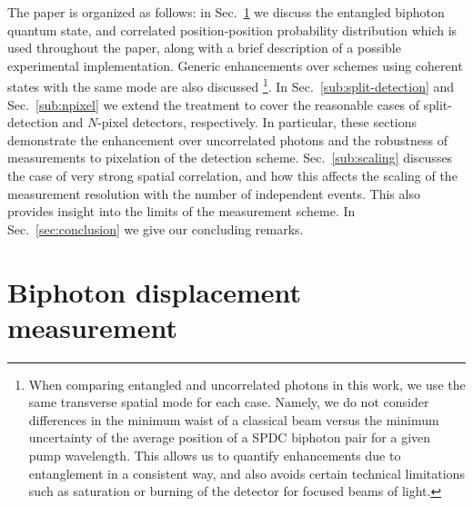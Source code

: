 The paper is organized as follows: 
in Sec.~\ref{sec:biphoton displacement} we discuss the entangled biphoton quantum state, and correlated position-position probability distribution which is used throughout the paper, along with a brief description of a possible experimental implementation.  
Generic enhancements over schemes using coherent states with the same mode are also discussed \footnote{When comparing entangled and uncorrelated photons in this work, we use the same transverse spatial mode for each case.  
	Namely, we do not consider differences in the minimum waist of a classical beam versus the minimum uncertainty of the average position of a SPDC biphoton pair for a given pump wavelength.  
	This allows us to quantify enhancements due to entanglement in a consistent way, and also avoids certain technical limitations such as saturation or burning of the detector for focused beams of light.}.
In Sec.~\ref{sub:split-detection} and Sec.~\ref{sub:npixel} we extend the treatment to cover the reasonable cases of split-detection and $N$-pixel detectors, respectively.
In particular, these sections demonstrate the enhancement over uncorrelated photons and the robustness of measurements to pixelation of the detection scheme.
Sec.~\ref{sub:scaling} discusses the case of very strong spatial correlation, and how this affects the scaling of the measurement resolution with the number of independent events.
This also provides insight into the limits of the measurement scheme.
In Sec.~\ref{sec:conclusion} we give our concluding remarks.

\section{Biphoton displacement measurement}\label{sec:biphoton displacement}

